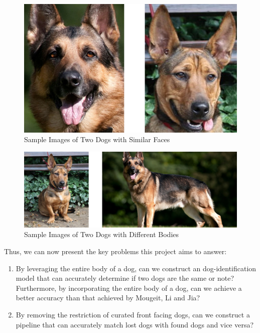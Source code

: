 \documentclass{article}
\begin{document}
\begin{figure}[h]
\centering
	\includegraphics{final-report-images/similar_faces.png}
\caption{Sample Images of Two Dogs with Similar Faces}
\label{fig:x similar faces}
\end{figure}

\newpage

\begin{figure}[h]
\centering
	\includegraphics{final-report-images/different_bodies.png}
\caption{Sample Images of Two Dogs with Different Bodies}
\label{fig:x different bodies}
\end{figure}

Thus, we can now present the key problems this project aims to answer:

\begin{enumerate}
  \item By leveraging the entire body of a dog, can we construct an dog-identification model that can accurately determine if two dogs are the same or note?  Furthermore, by incorporating the entire body of a dog, can we achieve a better accuracy than that achieved by Mougeit, Li and Jia?
  \item By removing the restriction of curated front facing dogs, can we construct a pipeline that can accurately match lost dogs with found dogs and vice versa? 
\end{enumerate}
\end{document}
